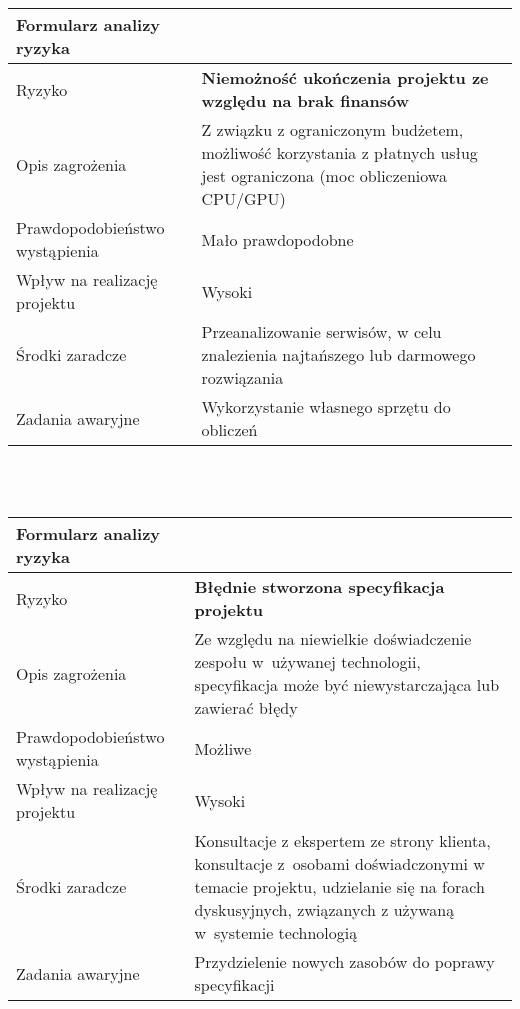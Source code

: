 \documentclass{article}
\begin{document}
\mbox{}\\\mbox{}\\

{\def\arraystretch{1.3}\tabcolsep=10pt
\begin{tabular}{|L{6cm}|L{9cm}|}
\hline
Formularz analizy ryzyka &  \\
\hline
Ryzyko 						   & \textbf{Niemożność ukończenia projektu ze względu na brak finansów} \\
\hline
Opis zagrożenia				   & Z związku z ograniczonym budżetem, możliwość korzystania z płatnych usług jest ograniczona (moc obliczeniowa CPU/GPU) \\
\hline
Prawdopodobieństwo wystąpienia & Mało prawdopodobne \\
\hline
Wpływ na realizację projektu   & Wysoki \\
\hline
Środki zaradcze				   & Przeanalizowanie serwisów, w celu znalezienia najtańszego lub darmowego rozwiązania \\
\hline
Zadania awaryjne			   & Wykorzystanie własnego sprzętu do obliczeń \\
\hline
\end{tabular}}

\mbox{}\\\mbox{}\\

{\def\arraystretch{1.3}\tabcolsep=10pt
\begin{tabular}{|L{6cm}|L{9cm}|}
\hline
Formularz analizy ryzyka &  \\
\hline
Ryzyko 						   & \textbf{Błędnie stworzona specyfikacja projektu} \\
\hline
Opis zagrożenia				   & Ze względu na niewielkie doświadczenie zespołu w~używanej technologii, specyfikacja może być niewystarczająca lub zawierać błędy \\
\hline
Prawdopodobieństwo wystąpienia & Możliwe \\
\hline
Wpływ na realizację projektu   & Wysoki \\
\hline
Środki zaradcze				   & Konsultacje z ekspertem ze strony klienta, konsultacje z~osobami doświadczonymi w temacie projektu, udzielanie się na forach dyskusyjnych, związanych z używaną w~systemie technologią \\
\hline
Zadania awaryjne			   & Przydzielenie nowych zasobów do poprawy specyfikacji \\
\hline
\end{tabular}}

\mbox{}\\\mbox{}\\
\end{document}

